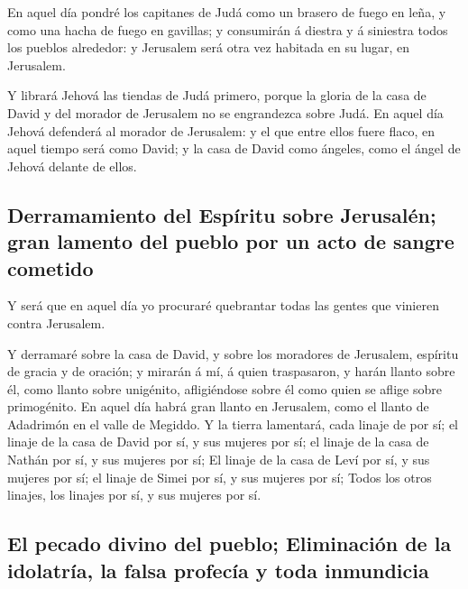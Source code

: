  En aquel día pondré los capitanes de Judá como un brasero
de fuego en leña, y como una hacha de fuego en gavillas; y consumirán á
diestra y á siniestra todos los pueblos alrededor: y Jerusalem será otra
vez habitada en su lugar, en Jerusalem.

 Y librará Jehová las tiendas de Judá primero, porque la
gloria de la casa de David y del morador de Jerusalem no se engrandezca
sobre Judá.  En aquel día Jehová defenderá al morador de
Jerusalem: y el que entre ellos fuere flaco, en aquel tiempo será como
David; y la casa de David como ángeles, como el ángel de Jehová delante
de ellos.

\hypertarget{derramamiento-del-espuxedritu-sobre-jerusaluxe9n-gran-lamento-del-pueblo-por-un-acto-de-sangre-cometido}{%
\subsection{Derramamiento del Espíritu sobre Jerusalén; gran lamento del
pueblo por un acto de sangre
cometido}\label{derramamiento-del-espuxedritu-sobre-jerusaluxe9n-gran-lamento-del-pueblo-por-un-acto-de-sangre-cometido}}

 Y será que en aquel día yo procuraré quebrantar todas las
gentes que vinieren contra Jerusalem.

 Y derramaré sobre la casa de David, y sobre los moradores
de Jerusalem, espíritu de gracia y de oración; y mirarán á mí, á quien
traspasaron, y harán llanto sobre él, como llanto sobre unigénito,
afligiéndose sobre él como quien se aflige sobre primogénito.
 En aquel día habrá gran llanto en Jerusalem, como el
llanto de Adadrimón en el valle de Megiddo.  Y la tierra
lamentará, cada linaje de por sí; el linaje de la casa de David por sí,
y sus mujeres por sí; el linaje de la casa de Nathán por sí, y sus
mujeres por sí;  El linaje de la casa de Leví por sí, y sus
mujeres por sí; el linaje de Simei por sí, y sus mujeres por sí;
 Todos los otros linajes, los linajes por sí, y sus mujeres
por sí.

\hypertarget{el-pecado-divino-del-pueblo-eliminaciuxf3n-de-la-idolatruxeda-la-falsa-profecuxeda-y-toda-inmundicia}{%
\subsection{El pecado divino del pueblo; Eliminación de la idolatría, la
falsa profecía y toda
inmundicia}\label{el-pecado-divino-del-pueblo-eliminaciuxf3n-de-la-idolatruxeda-la-falsa-profecuxeda-y-toda-inmundicia}}

